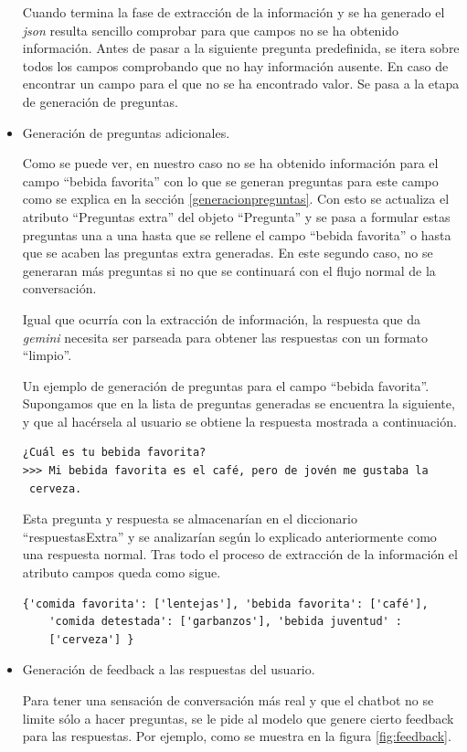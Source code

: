 \begin{itemize}
	 Cuando termina la fase de extracción de la información y se ha generado el \textit{json} resulta sencillo comprobar para que campos no se ha obtenido información. Antes de pasar a la siguiente pregunta predefinida, se itera sobre todos los campos comprobando que no hay información ausente. En caso de encontrar un campo para el que no se ha encontrado valor. Se pasa a la etapa de generación de preguntas. 
	
	\item Generación de preguntas adicionales.
	
	 Como se puede ver, en nuestro caso no se ha obtenido información para el campo ``bebida favorita'' con lo que se generan preguntas para este campo como se explica en la sección \ref{generacionpreguntas}. Con esto se actualiza el atributo ``Preguntas extra'' del objeto ``Pregunta'' y se pasa a formular estas preguntas una a una hasta que se rellene el campo ``bebida favorita'' o hasta que se acaben las preguntas extra generadas. En este segundo caso, no se generaran más preguntas si no que se continuará con el flujo normal de la conversación. 
	
	Igual que ocurría con la extracción de información, la respuesta que da \textit{gemini} necesita ser parseada para obtener las respuestas con un formato ``limpio''.
	
	Un ejemplo de generación de preguntas para el campo ``bebida favorita''. Supongamos que en la lista de preguntas generadas se encuentra la siguiente, y que al hacérsela al usuario se obtiene la respuesta mostrada a continuación. 
	
\begin{verbatim}
¿Cuál es tu bebida favorita? 
>>> Mi bebida favorita es el café, pero de jovén me gustaba la
 cerveza.

\end{verbatim}

Esta pregunta y respuesta se almacenarían en el diccionario ``respuestasExtra'' y se analizarían según lo explicado anteriormente como una respuesta normal. Tras todo el proceso de extracción de la información el atributo campos queda como sigue. 

\begin{verbatim}
{'comida favorita': ['lentejas'], 'bebida favorita': ['café'], 
	'comida detestada': ['garbanzos'], 'bebida juventud' : 
	['cerveza'] }

\end{verbatim}
	 \item Generación de feedback a las respuestas del usuario.
	 
	  Para tener una sensación de conversación más real y que el chatbot no se limite sólo a hacer preguntas, se le pide al modelo que genere cierto feedback para las respuestas. Por ejemplo, como se muestra en la figura \ref{fig:feedback}.
\end{itemize}

